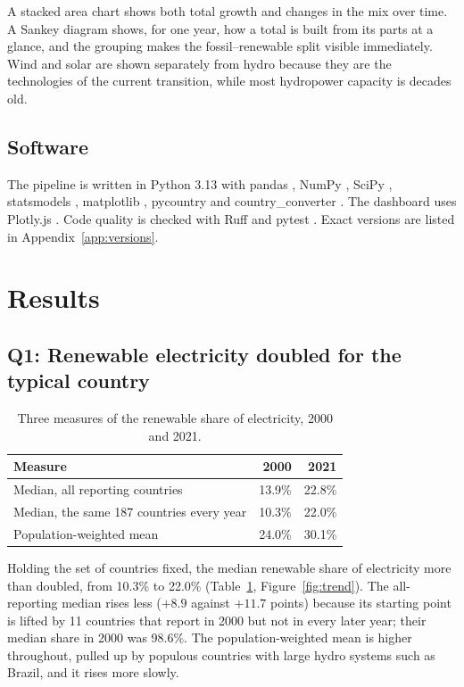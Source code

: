 \documentclass[11pt,a4paper]{article}
\begin{document}
\begin{why}
A stacked area chart shows both total growth and changes in the mix over time. A Sankey diagram shows, for one year, how a total is built from its parts at a glance, and the grouping makes the fossil--renewable split visible immediately. Wind and solar are shown separately from hydro because they are the technologies of the current transition, while most hydropower capacity is decades old.
\end{why}

\subsection{Software}
The pipeline is written in Python 3.13 with pandas \citep{mckinney2010}, NumPy \citep{harris2020}, SciPy \citep{virtanen2020}, statsmodels \citep{seabold2010}, matplotlib \citep{hunter2007}, pycountry \citep{pycountry} and country\_converter \citep{stadler2017}. The dashboard uses Plotly.js \citep{plotly}. Code quality is checked with Ruff \citep{ruff} and pytest \citep{pytest}. Exact versions are listed in Appendix~\ref{app:versions}.

\section{Results}\label{sec:results}

\subsection{Q1: Renewable electricity doubled for the typical country}

\begin{table}[H]
\centering\small
\caption{Three measures of the renewable share of electricity, 2000 and 2021.}\label{tab:trend}
\begin{tabular}{@{}lrr@{}}
\toprule
\textbf{Measure} & \textbf{2000} & \textbf{2021} \\
\midrule
Median, all reporting countries & 13.9\% & 22.8\% \\
Median, the same 187 countries every year & 10.3\% & 22.0\% \\
Population-weighted mean & 24.0\% & 30.1\% \\
\bottomrule
\end{tabular}
\end{table}

Holding the set of countries fixed, the median renewable share of electricity more than doubled, from 10.3\% to 22.0\% (Table~\ref{tab:trend}, Figure~\ref{fig:trend}). The all-reporting median rises less ($+8.9$ against $+11.7$ points) because its starting point is lifted by 11 countries that report in 2000 but not in every later year; their median share in 2000 was 98.6\%. The population-weighted mean is higher throughout, pulled up by populous countries with large hydro systems such as Brazil, and it rises more slowly.
\end{document}
